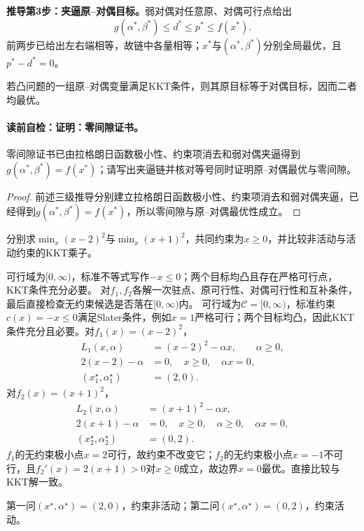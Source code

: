 \textbf{推导第3步：夹逼原--对偶目标。}弱对偶对任意原、对偶可行点给出
\[
g(\alpha^*,\beta^*)\le d^*\le p^*\le f(x^*).
\]
前两步已给出左右端相等，故链中各量相等；$x^*$与$(\alpha^*,\beta^*)$分别全局最优，且$p^*-d^*=0$。

\label{struct:V1-C07-CH14}
\begin{corollary}[零间隙证书]
若凸问题的一组原--对偶变量满足KKT条件，则其原目标等于对偶目标，因而二者均最优。
\end{corollary}
\paragraph{读前自检：证明：零间隙证书。}零间隙证书已由拉格朗日函数极小性、约束项消去和弱对偶夹逼得到$g(\alpha^*,\beta^*)=f(x^*)$；请写出夹逼链并核对等号同时证明原--对偶最优与零间隙。\par

\begin{proof}
前述三级推导分别建立拉格朗日函数极小性、约束项消去和弱对偶夹逼，已经得到$g(\alpha^*,\beta^*)=f(x^*)$，所以零间隙与原--对偶最优性成立。
\end{proof}

\label{struct:V1-C07-CH20}
\begin{example}[带非负约束的二次问题]\label{exm:V1-C07-kkt-nonnegative}
分别求$\min_x(x-2)^2$与$\min_x(x+1)^2$，共同约束为$x\ge0$，并比较非活动与活动约束的KKT乘子。
\end{example}
\begin{solution}
\SolGiven 可行域为$[0,\infty)$，标准不等式写作$-x\le0$；两个目标均凸且存在严格可行点，KKT条件充分必要。
\SolPlan 对$f_1,f_2$各解一次驻点、原可行性、对偶可行性和互补条件，最后直接检查无约束候选是否落在$[0,\infty)$内。
\SolDerive
可行域为$\mathcal C=[0,\infty)$，标准约束$c(x)=-x\le0$满足Slater条件，例如$x=1$严格可行；两个目标均凸，因此KKT条件充分且必要。对$f_1(x)=(x-2)^2$，
\[
\begin{aligned}
L_1(x,\alpha)&=(x-2)^2-\alpha x,\qquad \alpha\ge0,\\
2(x-2)-\alpha&=0,\quad x\ge0,\quad \alpha x=0,\\
(x_1^\star,\alpha_1^\star)&=(2,0).
\end{aligned}
\]
对$f_2(x)=(x+1)^2$，
\[
\begin{aligned}
L_2(x,\alpha)&=(x+1)^2-\alpha x,\\
2(x+1)-\alpha&=0,\quad x\ge0,\quad \alpha\ge0,\quad \alpha x=0,\\
(x_2^\star,\alpha_2^\star)&=(0,2).
\end{aligned}
\]
\SolCheck $f_1$的无约束极小点$x=2$可行，故约束不改变它；$f_2$的无约束极小点$x=-1$不可行，且$f_2'(x)=2(x+1)>0$对$x\ge0$成立，故边界$x=0$最优。直接比较与KKT解一致。

\SolAnswer 第一问$(x^\star,\alpha^\star)=(2,0)$，约束非活动；第二问$(x^\star,\alpha^\star)=(0,2)$，约束活动。
\end{solution}

